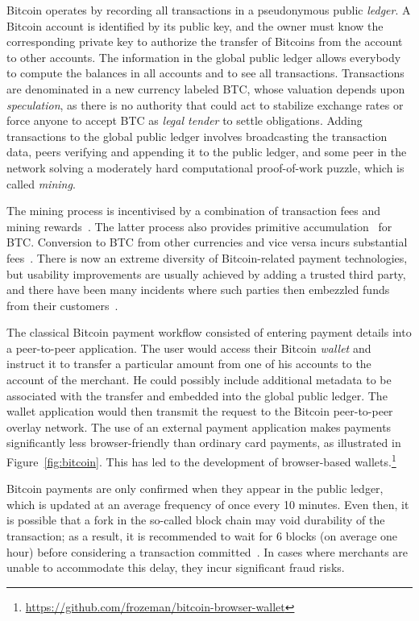 \documentclass{llncs}
\begin{document}
Bitcoin operates by recording all transactions in a pseu\-do\-ny\-mous
public {\em ledger}.  A Bitcoin account is identified by its public
key, and the owner must know the corresponding private key to
authorize the transfer of Bitcoins from the account to other accounts.
The information in the global public ledger allows everybody to
compute the balances in all accounts and to see all transactions.
Transactions are denominated in a new currency labeled BTC, whose
valuation depends upon {\em speculation}, as there is no authority
that could act to stabilize exchange rates or force anyone to
accept BTC as {\em legal tender} to settle obligations.  Adding transactions to
the global public ledger involves broadcasting the transaction data,
peers verifying and appending it to the public ledger, and some peer
in the network solving a moderately hard computational proof-of-work
puzzle, which is called {\em mining}.

The mining process is incentivised by a combination of transaction
fees and mining rewards~\cite{nakamoto2008bitcoin}. The latter
process also provides primitive accumulation~\cite{primitiveacc} for BTC.
Conversion to BTC from other currencies and vice versa incurs
substantial fees~\cite{BTCfees}.  There is now an extreme diversity of
Bitcoin-related payment technologies, but usability improvements are
usually achieved by adding a trusted third party, and there have been
many incidents where such parties then embezzled funds from their
customers~\cite{BTC:demise}.

The classical Bitcoin payment workflow consisted of entering payment
details into a peer-to-peer application.  The user would access their
Bitcoin {\em wallet} and instruct it to transfer a particular amount
from one of his accounts to the account of the merchant. He could
possibly include additional metadata to be associated with the
transfer and embedded into the global public ledger.  The wallet
application would then transmit the request to the Bitcoin
peer-to-peer overlay network.  The use of an external payment
application makes payments significantly less
browser-friendly than ordinary card payments, as illustrated in
Figure~\ref{fig:bitcoin}. This has led to the development of
browser-based
wallets.\footnote{\url{https://github.com/frozeman/bitcoin-browser-wallet}}

Bitcoin payments are only confirmed when they appear in the public
ledger, which is updated at an average frequency of once every 10
minutes.  Even then, it is possible that a fork in the so-called block
chain may void durability of the transaction; as a result, it is
recommended to wait for 6 blocks (on average one hour) before
considering a transaction committed~\cite{nakamoto2008bitcoin}.  In
cases where merchants are unable to accommodate this delay, they incur
significant fraud risks.
\end{document}
